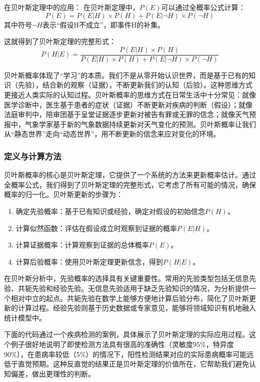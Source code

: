 \documentclass[
  twoside,12pt,fontset=none]{ctexbook}
\begin{document}
在贝叶斯定理中的应用：
在贝叶斯定理中，\(P(E)\)可以通过全概率公式计算：
\[P(E) = P(E|H) \times P(H) + P(E|\neg H) \times P(\neg H)\]
其中符号\(\neg H\)表示``假设H不成立''，即事件H的补集。

这就得到了贝叶斯定理的完整形式：
\[P(H|E) = \frac{P(E|H) \times P(H)}{P(E|H) \times P(H) + P(E|\neg H) \times P(\neg H)}\]

贝叶斯概率体现了``学习''的本质。我们不是从零开始认识世界，而是基于已有的知识（先验），结合新的观察（证据），不断更新我们的认知（后验）。这种思维方式更接近人类实际的认知过程。贝叶斯概率的思维方式在日常生活中十分常见：就像医学诊断中，医生基于患者的症状（证据）不断更新对疾病的判断（假设）；就像法庭审判中，陪审团基于呈堂证据逐步更新对被告有罪或无罪的信念；就像天气预报中，气象学家基于新的气象数据持续更新对天气变化的预测。贝叶斯概率让我们从``静态世界''走向``动态世界''，用不断更新的信念来应对变化的环境。

\hypertarget{ux5b9aux4e49ux4e0eux8ba1ux7b97ux65b9ux6cd5-1}{%
\subsubsection{定义与计算方法}\label{ux5b9aux4e49ux4e0eux8ba1ux7b97ux65b9ux6cd5-1}}

贝叶斯概率的核心是贝叶斯定理，它提供了一个系统的方法来更新概率估计。通过全概率公式，我们得到了贝叶斯定理的完整形式，它考虑了所有可能的情况，确保概率的归一化。贝叶斯更新的步骤为：

\begin{enumerate}
\def\labelenumi{\arabic{enumi}.}
\item
  确定先验概率：基于已有知识或经验，确定对假设的初始信念\(P(H)\)。
\item
  计算似然函数：评估在假设成立时观察到证据的概率\(P(E|H)\)。
\item
  计算证据概率：计算观察到证据的总体概率\(P(E)\)。
\item
  计算后验概率：使用贝叶斯定理更新信念，得到\(P(H|E)\)。
\end{enumerate}

在贝叶斯分析中，先验概率的选择具有关键重要性。常用的先验类型包括无信息先验、共轭先验和经验先验。无信息先验适用于缺乏先验知识的情况，为分析提供一个相对中立的起点。共轭先验在数学上能够方便地计算后验分布，简化了贝叶斯更新的计算过程。经验先验则基于历史数据或专家意见，能够将领域知识有机地融入统计模型中。

下面的代码通过一个疾病检测的案例，具体展示了贝叶斯定理的实际应用过程。这个例子很好地说明了即使检测方法具有很高的准确性（灵敏度95\%，特异度90\%），在患病率较低（5\%）的情况下，阳性检测结果对应的实际患病概率可能远低于直觉预期。这种反直觉的结果正是贝叶斯定理的价值所在，它帮助我们避免认知偏差，做出更理性的判断。
\end{document}
